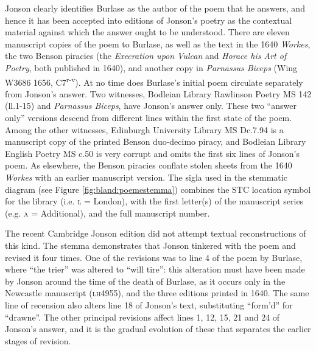 \begin{paper}
Jonson clearly identifies Burlase as the author of the poem that he
answers, and hence it has been accepted into editions of Jonson's poetry
as the contextual material against which the answer ought to be
understood. There are eleven manuscript copies of the poem to Burlase,
as well as the text in the 1640 \emph{Workes}, the two Benson piracies
(the \emph{Execration upon Vulcan} and \emph{Horace his Art of Poetry},
both published in 1640), and another copy in \emph{Parnassus Biceps}
(Wing W3686 1656, C7\textsuperscript{r-v}). At no time does Burlase's initial poem circulate separately from Jonson's answer. Two witnesses,
Bodleian Library Rawlinson Poetry MS 142 (ll.1-15) and \emph{Parnassus
Biceps}, have Jonson's answer only. These two ``answer only'' versions
descend from different lines within the first state of the poem. Among the
other witnesses, Edinburgh University Library MS Dc.7.94 is a manuscript
copy of the printed Benson duo-decimo piracy, and Bodleian Library
English Poetry MS c.50 is very corrupt and omits the first six lines of
Jonson's poem. As elsewhere, the Benson piracies conflate stolen sheets
from the 1640 \emph{Workes} with an earlier manuscript version. The
sigla used in the stemmatic diagram (see Figure \ref{fig:bland:poemestemma}) combines the STC location
symbol for the library (i.e. \textsc{l} = London), with the first
letter(s) of the manuscript series (e.g\textsc{. a} = Additional), and
the full manuscript number.

The recent Cambridge Jonson edition \citep{bevington_cambridge_2013} did not
attempt textual reconstructions of this kind. The stemma demonstrates
that Jonson tinkered with the poem and revised it four times. One of the
revisions was to line 4 of the poem by Burlase, where ``the trier'' was
altered to ``will tire'': this alteration must have been made by Jonson
around the time of the death of Burlase, as it occurs only in the
Newcastle manuscript (\textsc{lh4955}), and the three editions printed
in 1640. The same line of recension also alters line 18 of Jonson's
text, substituting ``form'd'' for ``drawne''. The other principal revisions
affect lines 1, 12, 15, 21 and 24 of Jonson's answer, and it is the
gradual evolution of these that separates the earlier stages of
revision.


\end{paper}
